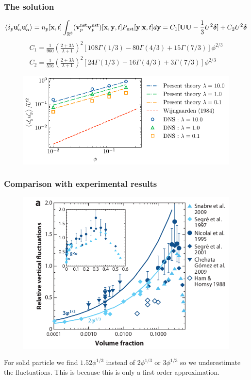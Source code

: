 \documentclass{sintefbeamer}
\begin{document}
\begin{frame}
  \frametitle{The solution }
  \begin{equation*}
    \left<\delta_p \textbf{u}_\alpha'\textbf{u}_\alpha'\right>
    = 
    n_p[\textbf{x},t]
    \int_{\mathbb{R}^3}
    (\textbf{v}^\text{nst}_p
    \textbf{v}^\text{nst}_p)[\textbf{x},\textbf{y},t]
    P_\text{nst}[\textbf{y}|\textbf{x},t]
    d\textbf{y}
    = 
    C_1[\textbf{UU} - \frac{1}{3}U^2\bm\delta] 
    + C_2U^2\bm\delta
\end{equation*}
\begin{align}
  C_1 = \frac{1}{960}\left(\frac{2+3\lambda}{\lambda+1}\right)^2 \left[
    108\Gamma(1/3)
    - 80\Gamma (4/3)
    +15\Gamma(7/3)
  \right]\phi^{2/3}\\
  C_2 = \frac{1}{576}\left(
    \frac{2+3\lambda}{\lambda+1}\right)^2 \left[
    24\Gamma(1/3)
    - 16\Gamma (4/3)
    +3\Gamma(7/3)
  \right]\phi^{2/3}
\end{align}
  \begin{figure}
    \includegraphics[height = 0.25\textwidth]{image/HOMOGENEOUS_final/CA/UUyy_Ga_5.pdf}
  \end{figure}
\end{frame}
\begin{frame}
  \frametitle{Comparison with experimental results}
\begin{figure}
  \includegraphics[height = 0.4\textwidth]{image/guazzeli.png}
\end{figure}
  
For solid particle we find $1.52\phi^{1/3}$ instead of $2\phi^{1/3}$ or $3\phi^{1/3}$ so we underestimate the fluctuations. 
This is because this is only a first order approximation. 


\end{frame}
\end{document}
